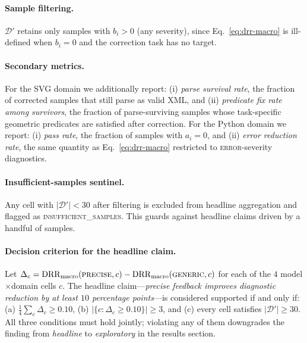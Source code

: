 \paragraph{Sample filtering.}
$\mathcal{D}'$ retains only samples with $b_i > 0$ (any severity), since Eq.~\ref{eq:drr-macro} is ill-defined when $b_i = 0$ and the correction task has no target.

\paragraph{Secondary metrics.}
For the SVG domain we additionally report: (i) \emph{parse survival rate}, the fraction of corrected samples that still parse as valid XML, and (ii) \emph{predicate fix rate among survivors}, the fraction of parse-surviving samples whose task-specific geometric predicates are satisfied after correction. For the Python domain we report: (i) \emph{pass rate}, the fraction of samples with $a_i = 0$, and (ii) \emph{error reduction rate}, the same quantity as Eq.~\ref{eq:drr-macro} restricted to \textsc{error}-severity diagnostics.

\paragraph{Insufficient-samples sentinel.}
Any cell with $|\mathcal{D}'| < 30$ after filtering is excluded from headline aggregation and flagged as \textsc{insufficient\_samples}. This guards against headline claims driven by a handful of samples.

\paragraph{Decision criterion for the headline claim.}
Let $\Delta_c = \mathrm{DRR}_{\text{macro}}(\textsc{precise},c) - \mathrm{DRR}_{\text{macro}}(\textsc{generic},c)$ for each of the $4$ model$\times$domain cells $c$. The headline claim---\emph{precise feedback improves diagnostic reduction by at least $10$ percentage points}---is considered supported if and only if: (a) $\tfrac{1}{4}\sum_c \Delta_c \geq 0.10$, (b) $|\{c : \Delta_c \geq 0.10\}| \geq 3$, and (c) every cell satisfies $|\mathcal{D}'| \geq 30$. All three conditions must hold jointly; violating any of them downgrades the finding from \emph{headline} to \emph{exploratory} in the results section.
